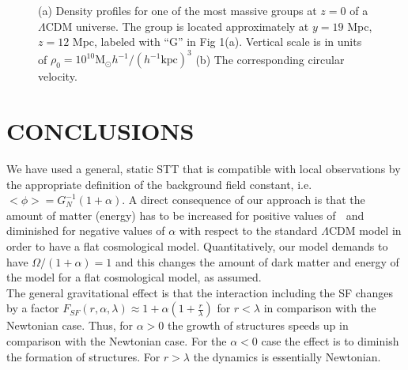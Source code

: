 \documentclass{article}
\begin{document}
\begin{figure}
\begin{subfigure}[b]{0.45\textwidth}
         \caption{}
         \label{fig:2b}
     \end{subfigure}
        \caption{(a) Density profiles for one of the most massive groups at $z = 0$ of a $\Lambda$CDM universe. The group is located approximately at $y = 19$ Mpc, $z = 12$ Mpc, labeled with “G” in Fig 1(a). Vertical scale is in units of $\rho_{0}=10^{10} \mathrm{M}_{\odot} h^{-1} /\left(h^{-1} \mathrm{kpc}\right)^{3}$ (b) The corresponding circular velocity.}
        \label{fig:2}
\end{figure}
\section{CONCLUSIONS}
We have used a general, static STT that is compatible
with local observations by the appropriate definition of
the background field constant, i.e. $<\phi>=G_{N}^{-1}(1+\alpha)$.
A direct consequence of our approach is that the amount
of matter (energy) has to be increased for positive values
of  and diminished for negative values of $\alpha$ with respect to the standard $\Lambda$CDM model in order to have a flat cosmological model. Quantitatively, our model demands to
have $\Omega /(1+\alpha)=1$ and this changes the amount of dark
matter and energy of the model for a flat cosmological
model, as assumed.\\
The general gravitational effect is that the interaction
including the SF changes by a factor  $F_{S F}(r, \alpha, \lambda) \approx 1+ \alpha\left(1+\frac{r}{\lambda}\right)$ for $r<\lambda$ in comparison with the Newtonian case. Thus, for $\alpha > 0$ the growth of structures speeds up
in comparison with the Newtonian case. For the $\alpha < 0$
case the effect is to diminish the formation of structures.
For $r > \lambda$ the dynamics is essentially Newtonian.\\
\end{document}
